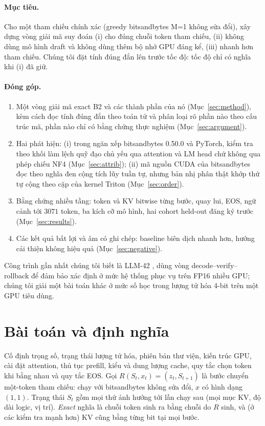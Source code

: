 \documentclass[a4paper,11pt]{article}
\newcommand{\code}[1]{\texttt{\detokenize{#1}}}
\begin{document}
\paragraph{Mục tiêu.} Cho một tham chiếu chính xác (greedy bitsandbytes M=1 không sửa đổi), xây dựng vòng giải mã suy đoán (i) cho đúng chuỗi token tham chiếu, (ii) không dùng mô hình draft và không dùng thêm bộ nhớ GPU đáng kể, (iii) nhanh hơn tham chiếu. Chúng tôi đặt tính đúng đắn lên trước tốc độ: tốc độ chỉ có nghĩa khi (i) đã giữ.

\paragraph{Đóng góp.}
\begin{enumerate}[nosep]
\item Một vòng giải mã exact B2 và các thành phần của nó (Mục~\ref{sec:method}), kèm cách đọc tính đúng đắn theo toán tử và phân loại rõ phần nào theo cấu trúc mã, phần nào chỉ có bằng chứng thực nghiệm (Mục~\ref{sec:argument}).
\item Hai phát hiện: (i) trong ngăn xếp bitsandbytes 0.50.0 và PyTorch, kiểm tra theo khối làm lệch quỹ đạo chủ yếu qua attention và LM head chứ không qua phép chiếu NF4 (Mục~\ref{sec:attrib}); (ii) mã nguồn CUDA của bitsandbytes đọc theo nghĩa đen cộng tích lũy tuần tự, nhưng bản nhị phân thật khớp thứ tự cộng theo cặp của kernel Triton (Mục~\ref{sec:order}).
\item Bằng chứng nhiều tầng: token và KV bitwise từng bước, quay lui, EOS, ngữ cảnh tới $3071$ token, ba kích cỡ mô hình, hai cohort held-out đăng ký trước (Mục~\ref{sec:results}).
\item Các kết quả bất lợi và âm có ghi chép: baseline biên dịch nhanh hơn, hướng cải thiện không hiệu quả (Mục~\ref{sec:negative}).
\end{enumerate}
Công trình gần nhất chúng tôi biết là LLM-42 \cite{gond2026llm42}, dùng vòng decode--verify--rollback để đảm bảo xác định ở mức hệ thống phục vụ trên FP16 nhiều GPU; chúng tôi giải một bài toán khác ở mức số học trong lượng tử hóa 4-bit trên một GPU tiêu dùng.

\section{Bài toán và định nghĩa}
Cố định trọng số, trạng thái lượng tử hóa, phiên bản thư viện, kiến trúc GPU, cài đặt attention, thủ tục prefill, kiểu và dung lượng cache, quy tắc chọn token khi bằng nhau và quy tắc EOS. Gọi $R(S_t,x_t)=(z_t,S_{t+1})$ là bước chuyển một-token tham chiếu: chạy \code{model(x)} với bitsandbytes không sửa đổi, $x$ có hình dạng $(1,1)$. Trạng thái $S_t$ gồm mọi thứ ảnh hưởng tới lần chạy sau (mọi mục KV, độ dài logic, vị trí). \emph{Exact} nghĩa là chuỗi token sinh ra bằng chuỗi do $R$ sinh, và (ở các kiểm tra mạnh hơn) KV cũng bằng từng bit tại mọi bước.
\end{document}
